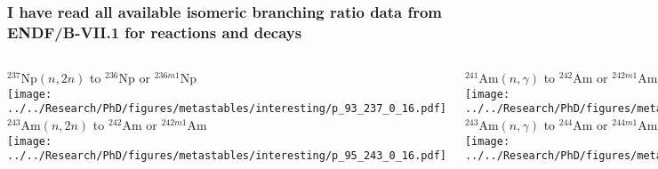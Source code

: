 \documentclass[compress,10pt]{beamer}
\begin{document}
\typeout{***********************************************************************************}

\begin{frame}
    \frametitle{I have read all available isomeric branching ratio data from ENDF/B-VII.1 for reactions and decays}

    \centering
    \begin{columns}[c]


        \centering

        {\footnotesize $^{237}\text{Np} (n,2n)$ to $^{236}\text{Np}$ or $^{236m1}\text{Np}$  } \\
        {}\texttt{[image: ../../Research/PhD/figures/metastables/interesting/p\_93\_237\_0\_16.pdf]} \\
        
        {\footnotesize $^{243}\text{Am} (n,2n)$ to $^{242}\text{Am}$ or $^{242m1}\text{Am}$  } \\
        {}\texttt{[image: ../../Research/PhD/figures/metastables/interesting/p\_95\_243\_0\_16.pdf]} \\


        \centering

        {\footnotesize $^{241}\text{Am} (n,\gamma)$ to $^{242}\text{Am}$ or $^{242m1}\text{Am}$  } \\
        {}\texttt{[image: ../../Research/PhD/figures/metastables/interesting/p\_95\_241\_0\_102.pdf]} \\

        {\footnotesize $^{243}\text{Am} (n,\gamma)$ to $^{244}\text{Am}$ or $^{244m1}\text{Am}$  } \\
        {}\texttt{[image: ../../Research/PhD/figures/metastables/interesting/p\_95\_243\_0\_102.pdf]} \

    \end{columns}

\end{frame}

\typeout{***********************************************************************************}
\end{document}
